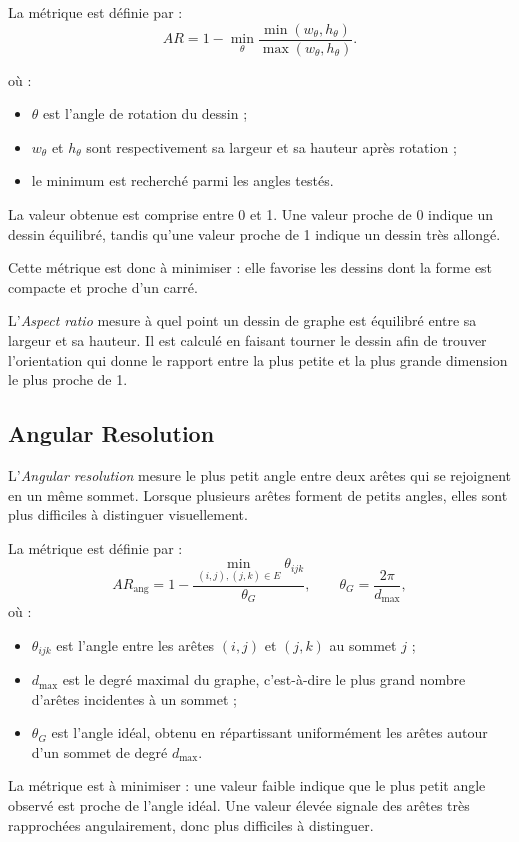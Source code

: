 \documentclass[a4paper,11pt]{article}
\begin{document}
La métrique est définie par :
\[
AR = 1 - \min_{\theta}
\frac{\min(w_\theta,h_\theta)}
{\max(w_\theta,h_\theta)}.
\]

où :
\begin{itemize}
    \item $\theta$ est l'angle de rotation du dessin ;
    \item $w_\theta$ et $h_\theta$ sont respectivement sa largeur et sa hauteur après rotation ;
    \item le minimum est recherché parmi les angles testés.
\end{itemize}

La valeur obtenue est comprise entre 0 et 1. Une valeur proche de 0 indique un dessin équilibré, tandis qu'une valeur proche de 1 indique un dessin très allongé.

Cette métrique est donc à minimiser : elle favorise les dessins dont la forme est compacte et proche d'un carré.

L'\textit{Aspect ratio} mesure à quel point un dessin de graphe est équilibré entre sa largeur et sa hauteur. Il est calculé en faisant tourner le dessin afin de trouver l'orientation qui donne le rapport entre la plus petite et la plus grande dimension le plus proche de 1.

\subsection{Angular Resolution}

L'\textit{Angular resolution} mesure le plus petit angle entre deux arêtes qui se rejoignent en un même sommet. Lorsque plusieurs arêtes forment de petits angles, elles sont plus difficiles à distinguer visuellement.

La métrique est définie par :
\[
AR_{\mathrm{ang}} =
1-\frac{\min_{(i,j),(j,k)\in E}\theta_{ijk}}{\theta_G},
\qquad
\theta_G=\frac{2\pi}{d_{\max}},
\]
où :
\begin{itemize}
    \item $\theta_{ijk}$ est l'angle entre les arêtes $(i,j)$ et $(j,k)$ au sommet $j$ ;
    \item $d_{\max}$ est le degré maximal du graphe, c'est-à-dire le plus grand nombre d'arêtes incidentes à un sommet ;
    \item $\theta_G$ est l'angle idéal, obtenu en répartissant uniformément les arêtes autour d'un sommet de degré $d_{\max}$.
\end{itemize}

La métrique est à minimiser : une valeur faible indique que le plus petit angle observé est proche de l'angle idéal. Une valeur élevée signale des arêtes très rapprochées angulairement, donc plus difficiles à distinguer.
\end{document}
